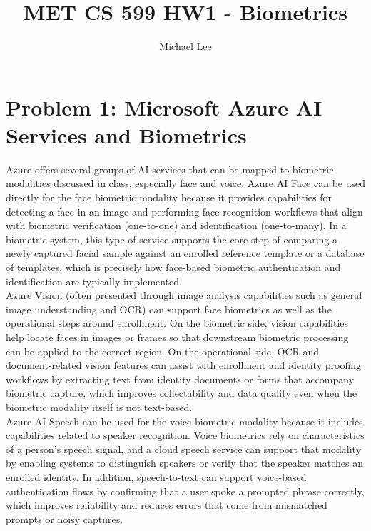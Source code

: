 \documentclass[11pt]{article}
\title{MET CS 599 HW1 - Biometrics}
\author{Michael Lee}
\date{}
\begin{document}
\maketitle

\section*{Problem 1: Microsoft Azure AI Services and Biometrics}

Azure offers several groups of AI services that can be mapped to biometric modalities discussed in class, especially face and voice. Azure AI Face can be used directly for the face biometric modality because it provides capabilities for detecting a face in an image and performing face recognition workflows that align with biometric verification (one-to-one) and identification (one-to-many). In a biometric system, this type of service supports the core step of comparing a newly captured facial sample against an enrolled reference template or a database of templates, which is precisely how face-based biometric authentication and identification are typically implemented. \\

Azure Vision (often presented through image analysis capabilities such as general image understanding and OCR) can support face biometrics as well as the operational steps around enrollment. On the biometric side, vision capabilities help locate faces in images or frames so that downstream biometric processing can be applied to the correct region. On the operational side, OCR and document-related vision features can assist with enrollment and identity proofing workflows by extracting text from identity documents or forms that accompany biometric capture, which improves collectability and data quality even when the biometric modality itself is not text-based. \\

Azure AI Speech can be used for the voice biometric modality because it includes capabilities related to speaker recognition. Voice biometrics rely on characteristics of a person's speech signal, and a cloud speech service can support that modality by enabling systems to distinguish speakers or verify that the speaker matches an enrolled identity. In addition, speech-to-text can support voice-based authentication flows by confirming that a user spoke a prompted phrase correctly, which improves reliability and reduces errors that come from mismatched prompts or noisy captures. \\
\end{document}
